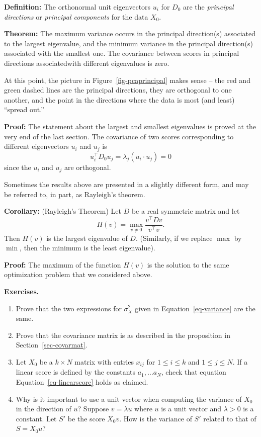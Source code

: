 \documentclass[
  11pt,
  letterpaper,
]{scrbook}
\theoremstyle{plain}
\theoremstyle{plain}
\theoremstyle{remark}
\begin{document}
\textbf{Definition:} The orthonormal unit eigenvectors \(u_{i}\) for
\(D_{0}\) are the \emph{principal directions} or \emph{principal
components} for the data \(X_{0}\).

\textbf{Theorem:} The maximum variance occurs in the principal
direction(s) associated to the largest eigenvalue, and the minimum
variance in the principal direction(s) associated with the smallest one.
The covariance between scores in principal directions associatedwith
different eigenvalues is zero.

At this point, the picture in Figure~\ref{fig-pcaprincipal} makes sense
-- the red and green dashed lines are the principal directions, they are
orthogonal to one another, and the point in the directions where the
data is most (and least) ``spread out.''

\textbf{Proof:} The statement about the largest and smallest eigenvalues
is proved at the very end of the last section. The covariance of two
scores corresponding to different eigenvectors \(u_{i}\) and \(u_{j}\)
is \[u_{i}^{\intercal}D_{0}u_{j} = \lambda_{j}(u_{i}\cdot u_{j}) = 0\]
since the \(u_{i}\) and \(u_{j}\) are orthogonal.

Sometimes the results above are presented in a slightly different form,
and may be referred to, in part, as Rayleigh's theorem.

\textbf{Corollary:} (Rayleigh's Theorem) Let \(D\) be a real symmetric
matrix and let \[
H(v) = \max_{v\not = 0}\frac{v^{\intercal}Dv}{v^{\intercal}v}.
\] Then \(H(v)\) is the largest eigenvalue of \(D\). (Similarly, if we
replace \(\max\) by \(\min\), then the minimum is the least eigenvalue).

\textbf{Proof:} The maximum of the function \(H(v)\) is the solution to
the same optimization problem that we considered above.

\textbf{Exercises.}

\begin{enumerate}
\def\labelenumi{\arabic{enumi}.}
\item
  Prove that the two expressions for \(\sigma_{X}^2\) given in
  Equation~\ref{eq-variance} are the same.
\item
  Prove that the covariance matrix is as described in the proposition in
  Section~\ref{sec-covarmat}.
\item
  Let \(X_{0}\) be a \(k\times N\) matrix with entries \(x_{ij}\) for
  \(1\le i\le k\) and \(1\le j\le N\). If a linear score is defined by
  the constants \(a_{1},\ldots a_{N}\), check that equation
  Equation~\ref{eq-linearscore} holds as claimed.
\item
  Why is it important to use a unit vector when computing the variance
  of \(X_{0}\) in the direction of \(u\)? Suppose \(v=\lambda u\) where
  \(u\) is a unit vector and \(\lambda>0\) is a constant. Let \(S'\) be
  the score \(X_{0}v\). How is the variance of \(S'\) related to that of
  \(S=X_{0}u\)?
\end{enumerate}
\end{document}
